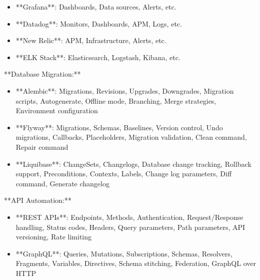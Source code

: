 \documentclass[11pt,a4paper]{article}
\begin{document}
\begin{itemize}
\item **Grafana**: Dashboards, Data sources, Alerts, etc.
\end{itemize}

\begin{itemize}
\item **Datadog**: Monitors, Dashboards, APM, Logs, etc.
\end{itemize}

\begin{itemize}
\item **New Relic**: APM, Infrastructure, Alerts, etc.
\end{itemize}

\begin{itemize}
\item **ELK Stack**: Elasticsearch, Logstash, Kibana, etc.
\end{itemize}

**Database Migration:**

\begin{itemize}
\item **Alembic**: Migrations, Revisions, Upgrades, Downgrades, Migration scripts, Autogenerate, Offline mode, Branching, Merge strategies, Environment configuration
\end{itemize}

\begin{itemize}
\item **Flyway**: Migrations, Schemas, Baselines, Version control, Undo migrations, Callbacks, Placeholders, Migration validation, Clean command, Repair command
\end{itemize}

\begin{itemize}
\item **Liquibase**: ChangeSets, Changelogs, Database change tracking, Rollback support, Preconditions, Contexts, Labels, Change log parameters, Diff command, Generate changelog
\end{itemize}

**API Automation:**

\begin{itemize}
\item **REST APIs**: Endpoints, Methods, Authentication, Request/Response handling, Status codes, Headers, Query parameters, Path parameters, API versioning, Rate limiting
\end{itemize}

\begin{itemize}
\item **GraphQL**: Queries, Mutations, Subscriptions, Schemas, Resolvers, Fragments, Variables, Directives, Schema stitching, Federation, GraphQL over HTTP
\end{itemize}
\end{document}
